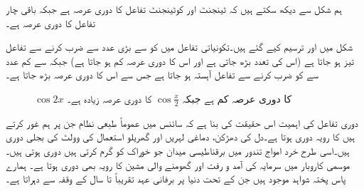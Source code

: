 ہم شکل  سے دیکھ سکتے ہیں  کہ ٹینجنٹ اور کوٹینجنٹ تفاعل کا دوری عرصہ  ہے جبکہ باقی چار تفاعل کا دوری عرصہ  ہے۔

شکل  میں  اور  ترسیم کیے گئے ہیں۔تکونیاتی تفاعل میں  کو  سے بڑی عدد سے ضرب کرنے سے تفاعل تیز ہو جاتا ہے (اس کی تعدد بڑھ جاتی ہے اور اس کا دوری عرصہ کم ہو جاتا ہے) جبکہ  سے کم عدد سے  کو ضرب کرنے سے تفاعل آہستہ ہو جاتا ہے جس سے اس کا دوری عرصہ بڑھ جاتا ہے۔ 
\begin{figure}
\centering
\begin{subfigure}{0.5\textwidth}
\centering
{}
\caption{}
\end{subfigure}%
\begin{subfigure}{0.5\textwidth}
\centering
{}
\caption{}
\end{subfigure}%
\caption{$\cos 2x$ کا دوری عرصہ کم ہے جبکہ $\cos\tfrac{x}{2}$ کا دوری عرصہ زیادہ ہے۔}
\label{شکل_ابتدا_کم_زیادہ_دوری_عرصہ}
\end{figure}

دوری تفاعل کی اہمیت اس حقیقت کی بنا ہے کہ سائنس میں عموماً طبعی نظام جن پر ہم غور کرتے ہیں  کا رویہ دوری ہوتا ہے۔دل کی دھڑکن، دماغی  لہریں اور  گھریلو استعمال کی  وولٹ کی بجلی دوری ہیں۔اسی طرح خرد امواج تندور میں برقناطیسی میدان جو خوراک کو گرم کرتی ہیں دوری ہوتی ہیں۔موسمی کاروبار میں سرمایہ کی آمد و رفت اور گھومنے والی مشین کا رویہ بھی دوری ہوتا ہے۔ ہمارے پاس پختہ شواہد موجود ہیں جن کے تحت دنیا پر برفانی عہد تقریباً  تا  سال کے وقفہ سے دہراتا ہے۔


